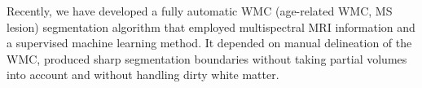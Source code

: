 Recently, we have developed a fully automatic WMC (age-related WMC, MS lesion) segmentation algorithm  that employed multispectral MRI information and a supervised machine learning method. It depended on manual delineation of the WMC, produced sharp segmentation boundaries without taking partial volumes into account and without handling dirty white matter.
    